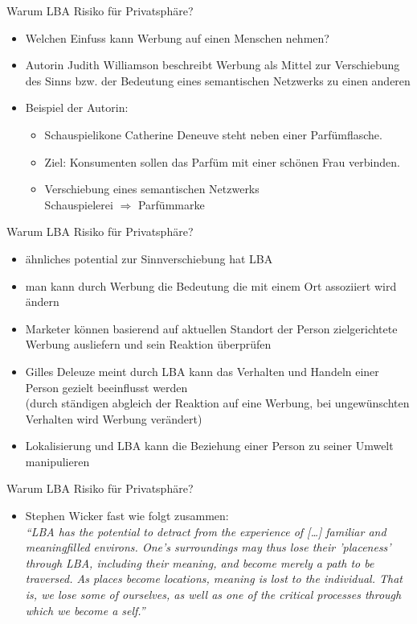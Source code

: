 \begin{frame}{Warum LBA Risiko für Privatsphäre?}
 \begin{itemize}
   \item Welchen Einfuss kann Werbung auf einen Menschen nehmen?
   \item Autorin Judith Williamson beschreibt Werbung als Mittel zur Verschiebung des Sinns bzw. der Bedeutung eines semantischen Netzwerks zu einen anderen
   \item Beispiel der Autorin:
   \begin{itemize}
     \item Schauspielikone Catherine Deneuve steht neben einer Parfümflasche.
     \item Ziel: Konsumenten sollen das Parfüm mit einer schönen Frau verbinden.
     \item Verschiebung eines semantischen Netzwerks\\
     Schauspielerei $\Rightarrow$ Parfümmarke
   \end{itemize}
 \end{itemize}
\end{frame}

\begin{frame}{Warum LBA Risiko für Privatsphäre?}
 \begin{itemize}
   \item ähnliches potential zur Sinnverschiebung hat LBA
   \item man kann durch Werbung die Bedeutung die mit einem Ort assoziiert wird ändern
   \item Marketer können basierend auf aktuellen Standort der Person zielgerichtete Werbung ausliefern und sein Reaktion überprüfen
   \item Gilles Deleuze meint durch LBA kann das Verhalten und Handeln einer Person gezielt beeinflusst werden\\
   (durch ständigen abgleich der Reaktion auf eine Werbung, bei ungewünschten Verhalten wird Werbung verändert)
   \item Lokalisierung und LBA kann die Beziehung einer Person zu seiner Umwelt manipulieren
 \end{itemize}
\end{frame}

\begin{frame}{Warum LBA Risiko für Privatsphäre?}
 \begin{itemize}
   \item Stephen Wicker fast wie folgt zusammen:\\ \vspace{.5cm}
   \textit{"`LBA has the potential to detract from the experience of [\dots] familiar and meaningfilled environs. One’s surroundings may thus lose their ’placeness’ through LBA, including their meaning, and become merely a path to be traversed. As places become locations, meaning is lost to the individual. That is, we lose some of ourselves, as well as one of the critical processes through which we become a self."'}
 \end{itemize}
\end{frame}

